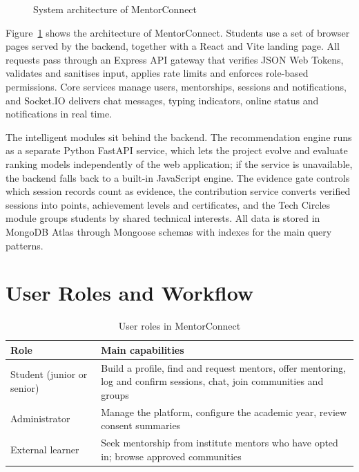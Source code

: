 \documentclass[12pt,a4paper]{report}
\begin{document}
\begin{figure}[h]
\caption{System architecture of MentorConnect}
\label{fig:arch}
\end{figure}

Figure~\ref{fig:arch} shows the architecture of MentorConnect. Students use a set of browser pages served by the backend, together with a React and Vite landing page. All requests pass through an Express API gateway that verifies JSON Web Tokens, validates and sanitises input, applies rate limits and enforces role-based permissions. Core services manage users, mentorships, sessions and notifications, and Socket.IO delivers chat messages, typing indicators, online status and notifications in real time.

The intelligent modules sit behind the backend. The recommendation engine runs as a separate Python FastAPI service, which lets the project evolve and evaluate ranking models independently of the web application; if the service is unavailable, the backend falls back to a built-in JavaScript engine. The evidence gate controls which session records count as evidence, the contribution service converts verified sessions into points, achievement levels and certificates, and the Tech Circles module groups students by shared technical interests. All data is stored in MongoDB Atlas through Mongoose schemas with indexes for the main query patterns.

\section{User Roles and Workflow}
\begin{table}[h]
\centering
\caption{User roles in MentorConnect}
\label{tab:roles}
\small
\begin{tabularx}{\textwidth}{>{\raggedright\arraybackslash}p{3.2cm}X}
\toprule
\textbf{Role} & \textbf{Main capabilities}\\
\midrule
Student (junior or senior) & Build a profile, find and request mentors, offer mentoring, log and confirm sessions, chat, join communities and groups\\
Administrator & Manage the platform, configure the academic year, review consent summaries\\
External learner & Seek mentorship from institute mentors who have opted in; browse approved communities\\
\bottomrule
\end{tabularx}
\end{table}
\end{document}
